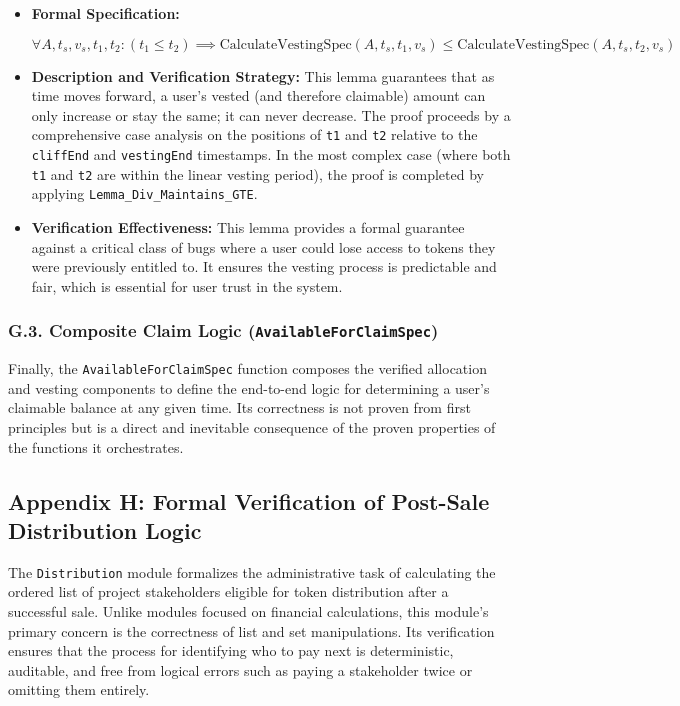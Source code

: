 \documentclass[
  english,
  onecolumn]{article}
\begin{document}
\begin{itemize}
\item
  \textbf{Formal Specification:}

  \(\forall A, t_s, v_s, t_1, t_2 : (t_1 \le t_2) \implies \text{CalculateVestingSpec}(A, t_s, t_1, v_s) \le \text{CalculateVestingSpec}(A, t_s, t_2, v_s)\)
\item
  \textbf{Description and Verification Strategy:} This lemma guarantees
  that as time moves forward, a user's vested (and therefore claimable)
  amount can only increase or stay the same; it can never decrease. The
  proof proceeds by a comprehensive case analysis on the positions of
  \texttt{t1} and \texttt{t2} relative to the \texttt{cliffEnd} and
  \texttt{vestingEnd} timestamps. In the most complex case (where both
  \texttt{t1} and \texttt{t2} are within the linear vesting period), the
  proof is completed by applying \texttt{Lemma\_Div\_Maintains\_GTE}.
\item
  \textbf{Verification Effectiveness:} This lemma provides a formal
  guarantee against a critical class of bugs where a user could lose
  access to tokens they were previously entitled to. It ensures the
  vesting process is predictable and fair, which is essential for user
  trust in the system.
\end{itemize}

\subsubsection{\texorpdfstring{G.3. Composite Claim Logic
(\texttt{AvailableForClaimSpec})}{G.3. Composite Claim Logic (AvailableForClaimSpec)}}\label{g.3.-composite-claim-logic-availableforclaimspec}

Finally, the \texttt{AvailableForClaimSpec} function composes the
verified allocation and vesting components to define the end-to-end
logic for determining a user's claimable balance at any given time. Its
correctness is not proven from first principles but is a direct and
inevitable consequence of the proven properties of the functions it
orchestrates.

\subsection{Appendix H: Formal Verification of Post-Sale Distribution
Logic}\label{appendix-h-formal-verification-of-post-sale-distribution-logic}

The \texttt{Distribution} module formalizes the administrative task of
calculating the ordered list of project stakeholders eligible for token
distribution after a successful sale. Unlike modules focused on
financial calculations, this module's primary concern is the correctness
of list and set manipulations. Its verification ensures that the process
for identifying who to pay next is deterministic, auditable, and free
from logical errors such as paying a stakeholder twice or omitting them
entirely.
\end{document}
